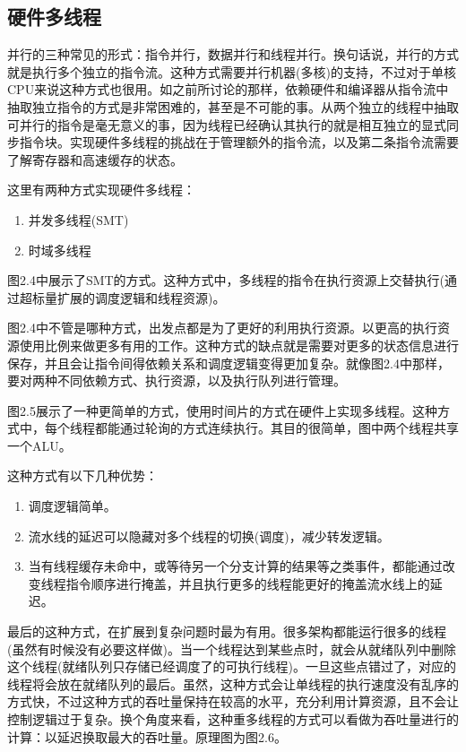 \subsection{硬件多线程}

并行的三种常见的形式：指令并行，数据并行和线程并行。换句话说，并行的方式就是执行多个独立的指令流。这种方式需要并行机器(多核)的支持，不过对于单核CPU来说这种方式也很用。如之前所讨论的那样，依赖硬件和编译器从指令流中抽取独立指令的方式是非常困难的，甚至是不可能的事。从两个独立的线程中抽取可并行的指令是毫无意义的事，因为线程已经确认其执行的就是相互独立的显式同步指令块。实现硬件多线程的挑战在于管理额外的指令流，以及第二条指令流需要了解寄存器和高速缓存的状态。

这里有两种方式实现硬件多线程：

\begin{enumerate}
\item 并发多线程(SMT)
\item 时域多线程
\end{enumerate}

图2.4中展示了SMT的方式。这种方式中，多线程的指令在执行资源上交替执行(通过超标量扩展的调度逻辑和线程资源)。


图2.4中不管是哪种方式，出发点都是为了更好的利用执行资源。以更高的执行资源使用比例来做更多有用的工作。这种方式的缺点就是需要对更多的状态信息进行保存，并且会让指令间得依赖关系和调度逻辑变得更加复杂。就像图2.4中那样，要对两种不同依赖方式、执行资源，以及执行队列进行管理。

图2.5展示了一种更简单的方式，使用时间片的方式在硬件上实现多线程。这种方式中，每个线程都能通过轮询的方式连续执行。其目的很简单，图中两个线程共享一个ALU。

这种方式有以下几种优势：

\begin{enumerate}
\item 调度逻辑简单。
\item 流水线的延迟可以隐藏对多个线程的切换(调度)，减少转发逻辑。
\item 当有线程缓存未命中，或等待另一个分支计算的结果等之类事件，都能通过改变线程指令顺序进行掩盖，并且执行更多的线程能更好的掩盖流水线上的延迟。
\end{enumerate}


最后的这种方式，在扩展到复杂问题时最为有用。很多架构都能运行很多的线程(虽然有时候没有必要这样做)。当一个线程达到某些点时，就会从就绪队列中删除这个线程(就绪队列只存储已经调度了的可执行线程)。一旦这些点错过了，对应的线程将会放在就绪队列的最后。虽然，这种方式会让单线程的执行速度没有乱序的方式快，不过这种方式的吞吐量保持在较高的水平，充分利用计算资源，且不会让控制逻辑过于复杂。换个角度来看，这种重多线程的方式可以看做为吞吐量进行的计算：以延迟换取最大的吞吐量。原理图为图2.6。

